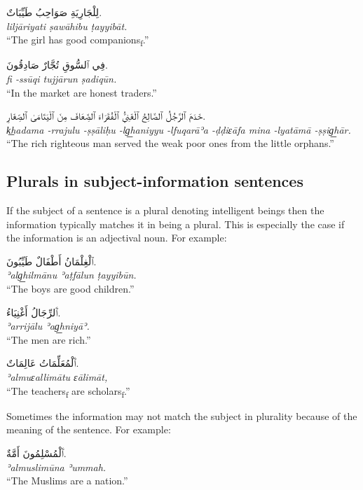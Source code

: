 \documentclass[
  10pt,
]{book}
\begin{document}
\foreignlanguage{arabic}{لِلْجَارِيَةِ صَوَاحِبُ طَيِّبَاتٌ.}\\
\emph{liljāriyati ṣawāhibu ṭayyibāt.}\\
\enquote{The girl has good companions\textsubscript{f}.}

\foreignlanguage{arabic}{فِي ٱلسُّوقِ تُجَّارٌ صَادِقُونَ.}\\
\emph{fi -ssūqi tujjārun ṣadiqūn.}\\
\enquote{In the market are honest traders.}

\foreignlanguage{arabic}{خَدَمَ ٱلرَّجُلُ ٱلصَّالِحُ ٱلْغَنِيُّ ٱلْفُقَرَاءَ ٱلضِّعَافَ مِنَ ٱلْيَتَامَىٰ ٱلصِّغَارِ.}\\
\emph{k͟hadama -rrajulu -ṣṣāliḥu -lg͟haniyyu -lfuqarāʾa -ḍḍiɛāfa mina -lyatāmā -ṣṣig͟hār.}\\
\enquote{The rich righteous man served the weak poor ones from the little orphans.}

\subsection{Plurals in subject-information sentences}\label{plurals-in-subject-information-sentences}

If the subject of a sentence is a plural denoting intelligent beings then the information typically matches it in being a plural. This is especially the case if the information is an adjectival noun. For example:

\foreignlanguage{arabic}{ٱلْغِلْمَانُ أَطْفَالٌ طَيِّبُونَ.}\\
\emph{ʾalg͟hilmānu ʾaṭfālun ṭayyibūn.}\\
\enquote{The boys are good children.}

\foreignlanguage{arabic}{ٱَلرِّجَالُ أَغْنِيَاءُ.}\\
\emph{ʾarrijālu ʾag͟hniyāʾ.}\\
\enquote{The men are rich.}

\foreignlanguage{arabic}{ٱَلْمُعَلِّمَاتُ عَالِمَاتٌ.}\\
\emph{ʾalmuɛallimātu ɛālimāt,}\\
\enquote{The teachers\textsubscript{f} are scholars\textsubscript{f}.}

Sometimes the information may not match the subject in plurality because of the meaning of the sentence. For example:

\foreignlanguage{arabic}{ٱَلْمُسْلِمُونَ أَمَّةٌ.}\\
\emph{ʾalmuslimūna ʾummah.}\\
\enquote{The Muslims are a nation.}
\end{document}
